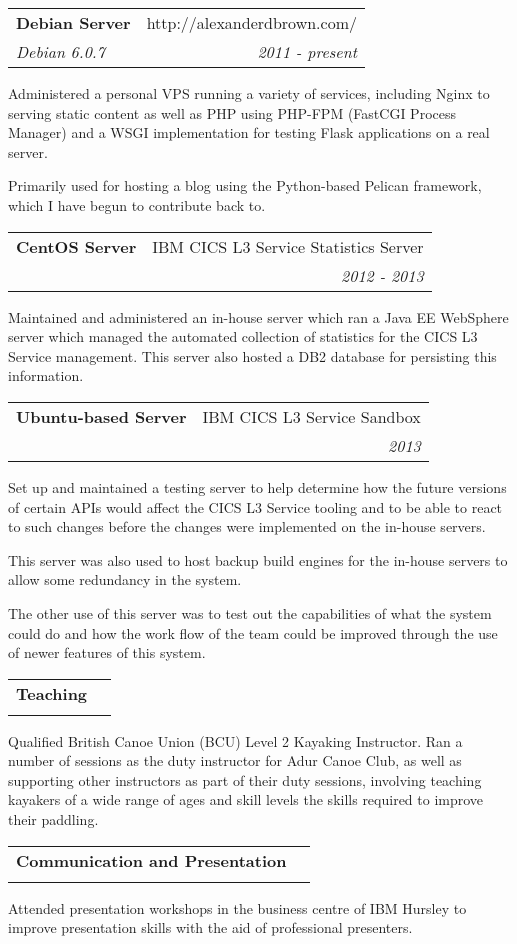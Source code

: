 \documentclass[letterpaper,11pt]{article}
\makeatletter
\newlength{\outerbordwidth}
\newcommand{\resheading}[1]{\vspace{8pt}
  \parbox{\textwidth}{\setlength{\FrameSep}{\outerbordwidth}
    \begin{shaded}
\setlength{\fboxsep}{0pt}\framebox[\textwidth][l]{\setlength{\fboxsep}{4pt}\fcolorbox{shadecolorB}{shadecolorB}{\textbf{\sffamily{\mbox{~}\makebox[6.762in][l]{\large #1} \vphantom{p\^{E}}}}}}
    \end{shaded}
  }\vspace{-5pt}
}
\newcommand{\ressubheading}[4]{
\vspace{10pt}
\begin{tabular*}{6.5in}{l@{\cftdotfill{\cftsecdotsep}\extracolsep{\fill}}r}
		\textbf{#1} & #2 \\
		\textit{#3} & \textit{#4} \\
\end{tabular*}\vspace{-6pt}
\vspace{10pt}}
\makeatother
\begin{document}
\ressubheading{Debian Server}{http://alexanderdbrown.com/}{Debian 6.0.7}{2011 - present}

Administered a personal VPS running a variety of services, including Nginx to
serving static content as well as PHP using PHP-FPM (FastCGI Process Manager)
and a WSGI implementation for testing Flask applications on a real server.

Primarily used for hosting a blog using the Python-based Pelican framework, 
which I have begun to contribute back to.


\ressubheading{CentOS Server}{IBM CICS L3 Service Statistics Server}{}{2012 - 2013}

Maintained and administered an in-house server which ran a Java EE WebSphere 
server which managed the automated collection of statistics for the CICS L3 
Service management. This server also hosted a DB2 database for persisting this
information.


\ressubheading{Ubuntu-based Server}{IBM CICS L3 Service Sandbox}{}{2013}

Set up and maintained a testing server to help determine how the future 
versions of certain APIs would affect the CICS L3 Service tooling and to be
able to react to such changes before the changes were implemented on the 
in-house servers.

This server was also used to host backup build engines for the in-house servers
to allow some redundancy in the system.

The other use of this server was to test out the capabilities of what the 
system could do and how the work flow of the team could be improved through the
use of newer features of this system.


\resheading{Other Skills}


\ressubheading{Teaching}{}{}{}
Qualified British Canoe Union (BCU) Level 2 Kayaking Instructor. Ran a number 
of sessions as the duty instructor for Adur Canoe Club, as well as supporting 
other instructors as part of their duty sessions, involving teaching kayakers 
of a wide range of ages and skill levels the skills required to improve their 
paddling.

\ressubheading{Communication and Presentation}{}{}{}
Attended presentation workshops in the business centre of IBM Hursley to 
improve presentation skills with the aid of professional presenters.
\end{document}
